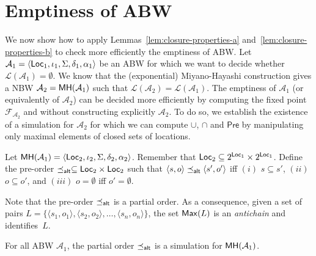 \documentclass{LMCS}
\newcommand{\Pre}{\mathsf{Pre}}
\newcommand{\Loc}{{\sf Loc}}
\newcommand{\tuple}[1]{\langle #1 \rangle}
\newcommand{\A}{\mathcal{A}}
\newcommand{\F}{\mathcal{F}}
\renewcommand{\L}{\mathcal{L}}
\newcommand{\MH}{{\sf MH}}
\newcommand{\Max}{{\sf Max}}
\begin{document}
\section{Emptiness of ABW}\label{sec:emptiness-alternating}

We now show how to apply Lemmas~\ref{lem:closure-properties-a} and~\ref{lem:closure-properties-b} to check more efficiently the
emptiness of ABW. Let $\A_1=\tuple{\Loc_1, \iota_1, \Sigma, \delta_1,
  \alpha_1}$ be an ABW for which we want to decide whether
$\L(\A_1)=\emptyset$.  We know that the (exponential) Miyano-Hayashi
construction gives a NBW $\A_2=\MH(\A_1)$ such that $\L(\A_2) =
\L(\A_1)$. The emptiness of $\A_1$ (or equivalently of
$\A_2$) can be decided more efficiently by computing the fixed point
$\F_{\A_2}$ and without constructing explicitly $\A_2$. To do
so, we establish the existence of a simulation for $\A_2$ for which we can
compute $\cup$, $\cap$ and $\Pre$ by manipulating only maximal
elements of closed sets of locations.




\begin{defi}\label{def:simulation-for-MH}
Let $\MH(\A_1) = \tuple{\Loc_2, \iota_2, \Sigma, \delta_2, \alpha_2}$.
Remember that $\Loc_2 \subseteq 2^{\Loc_1} \times 2^{\Loc_1}$. 
Define the pre-order $\preceq_{{\sf alt}} \subseteq \Loc_2 \times
\Loc_2$ such that $\tuple{s,o} \preceq_{{\sf alt}} \tuple{s',o'}$ iff 
$(i)$ $s \subseteq s'$, $(ii)$ $o \subseteq o'$, and $(iii)$ $o=\emptyset$ iff $o'=\emptyset$. 
\end{defi}

Note that the pre-order $\preceq_{{\sf alt}}$ is a partial order. 
As a consequence, given a set of pairs $L=\{ \tuple{s_1,o_1},\tuple{s_2,o_2}, \dots, \tuple{s_n,o_n} \}$, 
the set $\Max(L)$ is an \emph{antichain} and identifies~$L$.

\begin{lem}\label{lem:alt-simulation-relation}
For all ABW $\A_1$, the partial order $\preceq_{{\sf alt}}$ is a simulation 
for $\MH(\A_1)$.
\end{lem}
\end{document}
